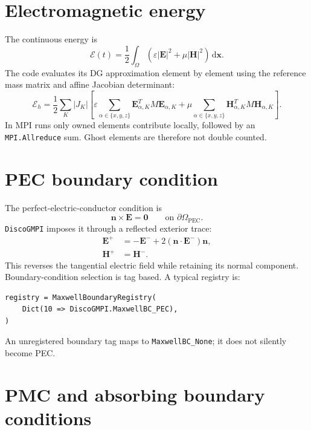 \documentclass[11pt,oneside]{book}
\newcommand{\pkg}{\texttt{DiscoGMPI}}
\newcommand{\code}[1]{\texttt{#1}}
\newcommand{\vect}[1]{\boldsymbol{#1}}
\newcommand{\dd}{\,\mathrm{d}}
\begin{document}
\section{Electromagnetic energy}

The continuous energy is
\begin{equation}
  \mathcal E(t)
  =
  \frac{1}{2}\int_\Omega
  \left(
    \varepsilon |\vect E|^2 + \mu |\vect H|^2
  \right)\dd \vect x.
\end{equation}
The code evaluates its DG approximation element by element using the reference
mass matrix and affine Jacobian determinant:
\begin{equation}
  \mathcal E_h
  =
  \frac{1}{2}
  \sum_{K}
  |J_K|
  \left[
    \varepsilon\sum_{\alpha\in\{x,y,z\}}
      \vect E_{\alpha,K}^{T}M\vect E_{\alpha,K}
    +
    \mu\sum_{\alpha\in\{x,y,z\}}
      \vect H_{\alpha,K}^{T}M\vect H_{\alpha,K}
  \right].
\end{equation}
In MPI runs only owned elements contribute locally, followed by an
\code{MPI.Allreduce} sum. Ghost elements are therefore not double counted.

\section{PEC boundary condition}

The perfect-electric-conductor condition is
\begin{equation}
  \vect n\times\vect E = \vect 0
  \qquad\text{on }\partial\Omega_{\mathrm{PEC}}.
\end{equation}
\pkg{} imposes it through a reflected exterior trace:
\begin{align}
  \vect E^+ &= -\vect E^- + 2(\vect n\cdot\vect E^-)\vect n,\\
  \vect H^+ &= \vect H^-.
\end{align}
This reverses the tangential electric field while retaining its normal
component. Boundary-condition selection is tag based. A typical registry is:

\begin{lstlisting}
registry = MaxwellBoundaryRegistry(
    Dict(10 => DiscoGMPI.MaxwellBC_PEC),
)
\end{lstlisting}

An unregistered boundary tag maps to \code{MaxwellBC\_None}; it does not
silently become PEC.

\section{PMC and absorbing boundary conditions}
\end{document}
